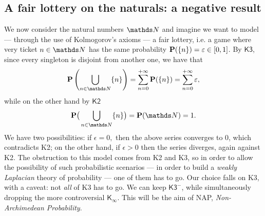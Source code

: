 \documentclass[draft.tex]{subfiles}
\begin{document}
	\subsection{A fair lottery on the naturals: a negative result} 
	We now consider the natural numbers $\NN$ and imagine we want to model --- through the use of Kolmogorov's axioms --- a fair lottery, i.e. a game where very ticket $n \in \NN$ has the same probability $\textbf{P}(\{n\}) = \varepsilon \in [0,1]$. By $\textsf{K3}$, since every singleton is disjoint from another one, we have that
	\begin{equation*}
		\prob\left(\bigcup_{n \in \NN} \{n\}\right) = \sum\limits_{n = 0}^{+\infty} \prob(\{n\}) = \sum\limits_{n = 0}^{+\infty} \epsilon,
	\end{equation*}
	while on the other hand by $\textsf{K2}$
	\begin{equation*}
		\prob\big(\bigcup_{n \in \NN}\{n\}\big) = \prob(\NN) = 1.
	\end{equation*}
	We have two possibilities: if $\epsilon = 0,$ then the above series converges to 0, which contradicts \textsf{K2}; on the other hand, if $\epsilon > 0$ then the series diverges, again against \textsf{K2}. The obstruction to this model comes from \textsf{K2} and \textsf{K3}, so in order to allow the possibility of such probabilistic scenarios --- in order to build a \emph{weakly Laplacian} theory of probability --- one of them has to go. Our choice falls on \textsf{K3}, with a caveat: not \textit{all} of \textsf{K3} has to go. We can keep $\textsf{K3}^{-}$, while simultaneously dropping the more controversial $\textsf{K}_{\infty}$. This will be the aim of NAP, \emph{Non-Archimedean Probability}.
\end{document}
